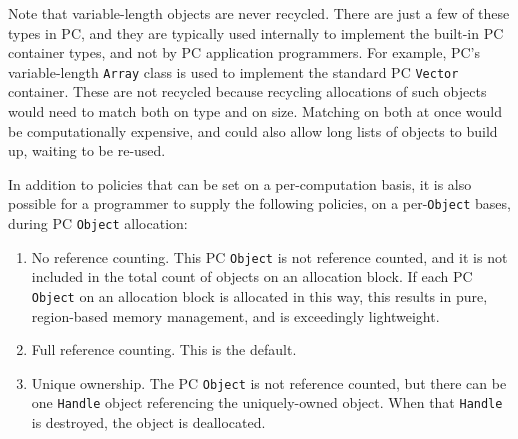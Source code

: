 Note that
variable-length objects are never recycled.  There are just a few of these types in PC, and they are typically
used internally to implement the built-in PC container
types, and not by PC application programmers.  For example, PC's variable-length
\texttt{Array} class is used to implement the standard PC \texttt{Vector} container.  
These are not recycled because recycling allocations of such objects would need to match both on type and on size.  Matching on both at once would 
be computationally expensive, and could also allow long lists of objects to build up, waiting to be re-used.

In addition to policies that can be set on a per-computation basis,
it is also possible for a programmer to supply the following policies, on a per-\texttt{Object} bases, during PC \texttt{Object} allocation:

\begin{enumerate}

\item No reference counting.  This PC \texttt{Object} is not reference counted, and it is not included in the total count of objects on an allocation
block.  If each PC \texttt{Object} on an allocation block
is allocated in this way, this results in pure, region-based memory management, and is exceedingly lightweight.
\item Full reference counting.  This is the default.
\item Unique ownership.  The PC \texttt{Object} is not reference counted, but there can be one \texttt{Handle} object referencing the uniquely-owned
object.  When that \texttt{Handle} is destroyed, the object is deallocated.

\end{enumerate}


